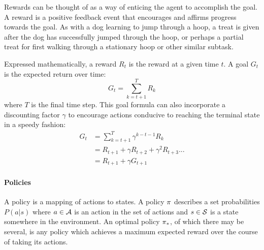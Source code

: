 Rewards can be thought of as a way of enticing the agent to accomplish the goal.
%
A reward is a positive feedback event that encourages and affirms progress
towards the goal.
%
As with a dog learning to jump through a hoop,
a treat is given after the dog has successfully jumped through the hoop,
or perhaps a partial treat for first walking through a stationary hoop
or other similar subtask.

Expressed mathematically, a reward $R_t$ is the reward at a given time $t$.
%
A goal $G_t$ is the expected return over time:
\[
	G_t = \sum_{k=t+1}^{T} R_k
\]
where $T$ is the final time step.
%
This goal formula can also incorporate a discounting factor $\gamma$ to
encourage actions conducive to reaching the terminal state in a speedy fashion:
\begin{align*}
	G_t &= \sum_{k=t+1}^{T} \gamma^{k-t-1} R_k \\
		&= R_{t+1} + \gamma R_{t+2} + \gamma^2 R_{t+3} ... \\
		&= R_{t+1} + \gamma G_{t+1}
\end{align*}

\paragraph{Policies}

A policy is a mapping of actions to states.
%
A policy $\pi$ describes a set probabilities $P(a|s)$ where
$a \in \mathcal{A}$ is an action in the set of actions
and $s \in \mathcal{S}$ is a state somewhere in the environment.
%
An optimal policy $\pi_*$,
of which there may be several,
is any policy which achieves a maximum expected reward over the course of
taking its actions.

